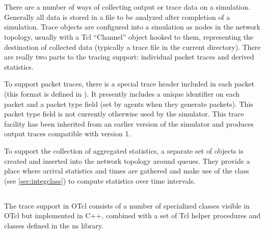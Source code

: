 %
%
\section{}

There are a number of ways of collecting output or
trace data on a simulation.
Generally all data is stored in a file to be analyzed
after completion of a simulation.
Trace objects are configured into a simulation as nodes in the
network topology, usually with a Tcl ``Channel'' object
hooked to them, representing the destination of collected data
(typically a trace file in the current directory).
There are really two parts to the tracing support: individual
packet traces and derived statistics.

To support packet traces, there is a special trace header
included in each packet (this format is defined in ).
It presently includes a unique identifier on each packet and a
packet type field (set by agents when they generate packets).
This packet type field is not currently otherwise used by the simulator.
This trace facility has been inherited from an earlier version of the
simulator and produces output traces compatible with  version 1.

To support the collection of aggregated statistics, a separate
set of objects is created and inserted into the network topology
around queues.
They provide a place where
arrival statistics and times are gathered and make
use of the  class (see \ref{sec:integclass}) to
compute statistics over time intervals.

\subsection{}

The trace support in OTcl consists of a number of specialized
classes visible in OTcl but implemented in C++, combined
with a set of Tcl helper procedures and classes defined in the ns library.

